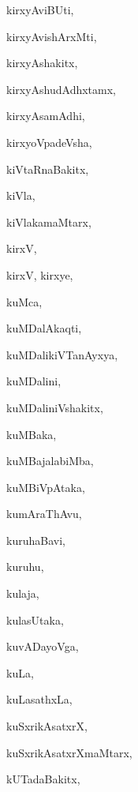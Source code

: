 \begin{multicols}{3}
{\noindent
{kirxyAviBUti}, \pageref{kirxyAviBUti}

\noindent
{kirxyAvishArxMti}, \pageref{kirxyAvishArxMti}

\noindent
{kirxyAshakitx}, \pageref{kirxyAshakitx}

\noindent
{kirxyAshudAdhxtamx}, \pageref{kirxyAshudAdhxtamx}

\noindent
{kirxyAsamAdhi}, \pageref{kirxyAsamAdhi}

\noindent
{kirxyoVpadeVsha}, \pageref{kirxyoVpadeVsha}

\noindent
{kiVtaRnaBakitx}, \pageref{kiVtaRnaBakitx}

\noindent
{kiVla}, \pageref{kiVla}

\noindent
{kiVlakamaMtarx}, \pageref{kiVlakamaMtarx}

\noindent
{kirxV}, \pageref{kirxV}

\noindent
{kirxV, kirxye}, \pageref{kirxV, kirxye}

\noindent
{kuMca}, \pageref{kuMca}

\noindent
{kuMDalAkaqti}, \pageref{kuMDalAkaqti}

\noindent
{kuMDalikiVTanAyxya}, \pageref{kuMDalikiVTanAyxya}

\noindent
{kuMDalini}, \pageref{kuMDalini}

\noindent
{kuMDaliniVshakitx}, \pageref{kuMDaliniVshakitx}

\noindent
{kuMBaka}, \pageref{kuMBaka}

\noindent
{kuMBajalabiMba}, \pageref{kuMBajalabiMba}

\noindent
{kuMBiVpAtaka}, \pageref{kuMBiVpAtaka}

\noindent
{kumAraThAvu}, \pageref{kumAraThAvu}

\noindent
{kuruhaBavi}, \pageref{kuruhaBavi}

\noindent
{kuruhu}, \pageref{kuruhu}

\noindent
{kulaja}, \pageref{kulaja}

\noindent
{kulasUtaka}, \pageref{kulasUtaka}

\noindent
{kuvADayoVga}, \pageref{kuvADayoVga}

\noindent
{kuLa}, \pageref{kuLa}

\noindent
{kuLasathxLa}, \pageref{kuLasathxLa}

\noindent
{kuSxrikAsatxrX}, \pageref{kuSxrikAsatxrX}

\noindent
{kuSxrikAsatxrXmaMtarx}, \pageref{kuSxrikAsatxrXmaMtarx}

\noindent
{kUTadaBakitx}, \pageref{kUTadaBakitx}

}
\end{multicols}
